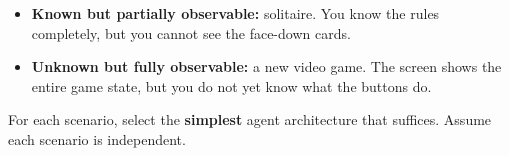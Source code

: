 \begin{enumerate}
\begin{sol}
\begin{itemize}[leftmargin=1.5em]
\item \textbf{Known but partially observable:} solitaire. You know the rules completely, but
you cannot see the face-down cards.
\item \textbf{Unknown but fully observable:} a new video game. The screen shows the entire game
state, but you do not yet know what the buttons do.
\end{itemize}
\end{sol}
\end{enumerate}

\newpage

For each scenario, select the \textbf{simplest} agent architecture that suffices. Assume each
scenario is independent.

